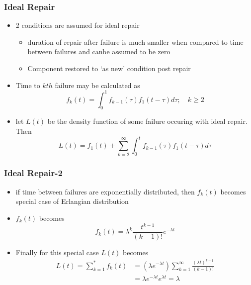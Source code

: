 \documentclass{beamer}  %
\begin{document}
\begin{frame}
\frametitle{Ideal Repair}

\begin{itemize}
\item 2 conditions are assumed for ideal repair
\begin{itemize}
\item duration of repair after failure is much smaller when compared to time between failures and canbe assumed to be zero

\item Component restored to `as new' condition post repair
\end{itemize}
\item Time to $kth$ failure may be calculated as $$f_{k}(t)=\int_{0}^{1} f_{k-1}(\tau) f_{1}(t-\tau) d \tau ; \quad k \geq 2$$

\item let $L(t)$ be the density function of some failure occuring with ideal repair. Then
$$L(t)=f_{1}(t)+\sum_{k=2}^{\infty} \int_{0}^{t} f_{k-1}(\tau) f_{1}(t-\tau) d \tau$$

\end{itemize}


\end{frame}

\begin{frame}
\frametitle{Ideal Repair-2}

\begin{itemize}
\item if time between failures are exponentially distributed, then $f_k(t)$ becomes special case of Erlangian distribution

\item $f_k(t)$ becomes $$f_{k}(t)=\lambda^{k} \frac{t^{k-1}}{(k-1) !} e^{-\lambda t}$$

\item Finally for this special case $L(t)$ becomes $$\begin{aligned}
L(t)=\sum_{k=1}^{*} f_{k}(t) &=\left(\lambda e^{-\lambda t}\right) \sum_{k=1}^{\infty} \frac{(\lambda t)^{k-1}}{(k-1) !} \\
&=\lambda e^{-\lambda t} e^{\lambda t}=\lambda
\end{aligned}$$

\end{itemize}


\end{frame}
\end{document}
